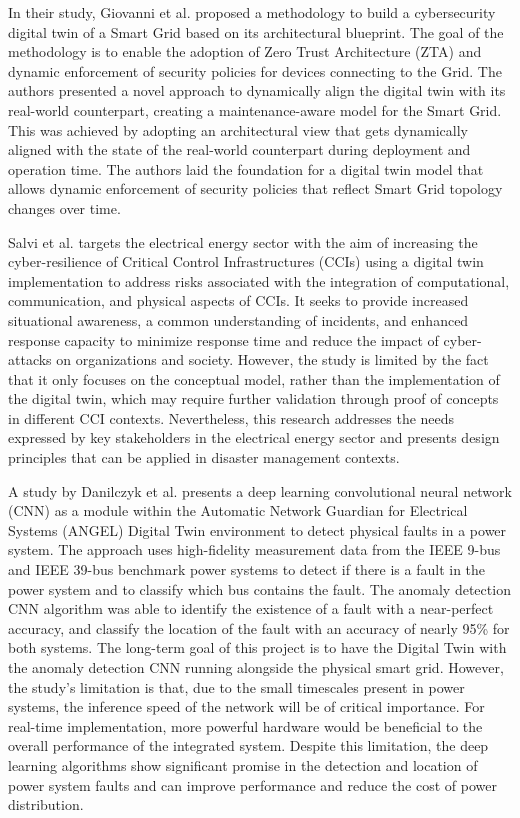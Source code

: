 In their study, Giovanni et al.\cite{giovannipaolosellittoEnablingZeroTrust2021} proposed a methodology to build a cybersecurity digital twin of a Smart Grid based on its architectural blueprint. The goal of the methodology is to enable the adoption of Zero Trust Architecture (ZTA) and dynamic enforcement of security policies for devices connecting to the Grid. The authors presented a novel approach to dynamically align the digital twin with its real-world counterpart, creating a maintenance-aware model for the Smart Grid. This was achieved by adopting an architectural view that gets dynamically aligned with the state of the real-world counterpart during deployment and operation time. The authors laid the foundation for a digital twin model that allows dynamic enforcement of security policies that reflect Smart Grid topology changes over time. 


Salvi et al.\cite{salviCyberresilienceCriticalCyber2022} targets the electrical energy sector with the aim of increasing the cyber-resilience of Critical Control Infrastructures (CCIs) using a digital twin implementation to address risks associated with the integration of computational, communication, and physical aspects of CCIs. It seeks to provide increased situational awareness, a common understanding of incidents, and enhanced response capacity to minimize response time and reduce the impact of cyber-attacks on organizations and society. However, the study is limited by the fact that it only focuses on the conceptual model, rather than the implementation of the digital twin, which may require further validation through proof of concepts in different CCI contexts. Nevertheless, this research addresses the needs expressed by key stakeholders in the electrical energy sector and presents design principles that can be applied in disaster management contexts.


A study by Danilczyk et al.\cite{danilczykSmartGridAnomaly2021} presents a deep learning convolutional neural network (CNN) as a module within the Automatic Network Guardian for Electrical Systems (ANGEL) Digital Twin environment to detect physical faults in a power system. The approach uses high-fidelity measurement data from the IEEE 9-bus and IEEE 39-bus benchmark power systems to detect if there is a fault in the power system and to classify which bus contains the fault. The anomaly detection CNN algorithm was able to identify the existence of a fault with a near-perfect accuracy, and classify the location of the fault with an accuracy of nearly 95\% for both systems. The long-term goal of this project is to have the Digital Twin with the anomaly detection CNN running alongside the physical smart grid. However, the study's limitation is that, due to the small timescales present in power systems, the inference speed of the network will be of critical importance. For real-time implementation, more powerful hardware would be beneficial to the overall performance of the integrated system. Despite this limitation, the deep learning algorithms show significant promise in the detection and location of power system faults and can improve performance and reduce the cost of power distribution.

